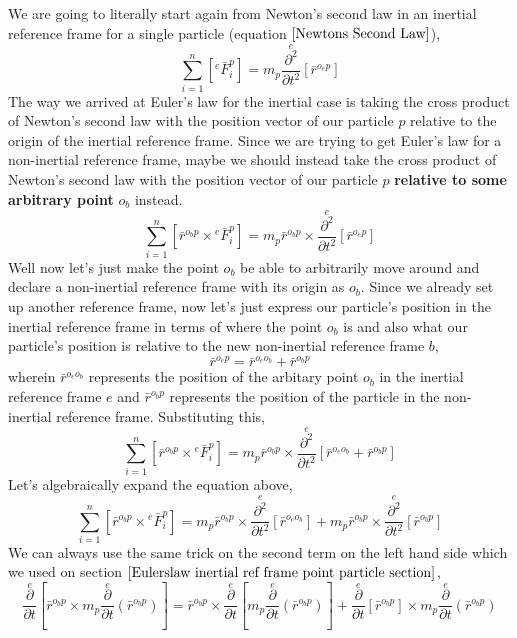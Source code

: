 We are going to literally start again from Newton's second law in an inertial reference frame for a single particle (equation $\ref{Newtons Second Law}$),
$$\sum^{n}_{i = 1}\left[{}^{e}\bar{F}^{p}_{i}\right] = m_{p}\overset{e}{\frac{\partial^{2}}{\partial t^{2}}}[\bar{r}^{o_{e}p}]$$
The way we arrived at Euler's law for the inertial case is taking the cross product of Newton's second law with the position vector of our particle $p$ relative to the origin of the inertial reference frame.
Since we are trying to get Euler's law for a non-inertial reference frame, maybe we should instead take the cross product of Newton's second law with the position vector of our particle $p$ \textbf{relative to some arbitrary point} $o_{b}$ instead.
$$\sum^{n}_{i = 1}\left[\bar{r}^{o_{b}p}\times{}^{e}\bar{F}^{p}_{i}\right] = m_{p}\bar{r}^{o_{b}p}\times\overset{e}{\frac{\partial^{2}}{\partial t^{2}}}[\bar{r}^{o_{e}p}]$$
Well now let's just make the point $o_{b}$ be able to arbitrarily move around and declare a non-inertial reference frame with its origin as $o_{b}$.
Since we already set up another reference frame, now let's just express our particle's position in the inertial reference frame in terms of where the point $o_{b}$ is and also what our particle's position is relative to the new non-inertial reference frame $b$,
$$\bar{r}^{o_{e}p} = \bar{r}^{o_{e}o_{b}} + \bar{r}^{o_{b}p}$$
wherein $\bar{r}^{o_{e}o_{b}}$ represents the position of the arbitary point $o_{b}$ in the inertial reference frame $e$ and $\bar{r}^{o_{b}p}$ represents the position of the particle in the non-inertial reference frame. Substituting this,
$$\sum^{n}_{i = 1}\left[\bar{r}^{o_{b}p}\times{}^{e}\bar{F}^{p}_{i}\right] = m_{p}\bar{r}^{o_{b}p}\times\overset{e}{\frac{\partial^{2}}{\partial t^{2}}}[ \bar{r}^{o_{e}o_{b}} + \bar{r}^{o_{b}p} ]$$
Let's algebraically expand the equation above,
\begin{equation}\sum^{n}_{i = 1}\left[\bar{r}^{o_{b}p}\times{}^{e}\bar{F}^{p}_{i}\right] = m_{p}\bar{r}^{o_{b}p}\times\overset{e}{\frac{\partial^{2}}{\partial t^{2}}}[\bar{r}^{o_{e}o_{b}}] + m_{p}\bar{r}^{o_{b}p}\times\overset{e}{\frac{\partial^{2}}{\partial t^{2}}}[\bar{r}^{o_{b}p}] \label{system of particles eulers law non-inertial primitive 1}\end{equation}
We can always use the same trick on the second term on the left hand side which we used on section $\ref{Eulerslaw inertial ref frame point particle section}$,
$$\overset{e}{\frac{\partial}{\partial t}}\left[\bar{r}^{o_{b}p}\times m_{p}\overset{e}{\frac{\partial}{\partial t}}(\bar{r}^{o_{b}p})\right] = 
\bar{r}^{o_{b}p}\times\overset{e}{\frac{\partial}{\partial t}}\left[m_{p}\overset{e}{\frac{\partial}{\partial t}}(\bar{r}^{o_{b}p})\right]
 + \overset{e}{\frac{\partial}{\partial t}}\left[\bar{r}^{o_{b}p}\right]\times m_{p}\overset{e}{\frac{\partial}{\partial t}}(\bar{r}^{o_{b}p})$$
